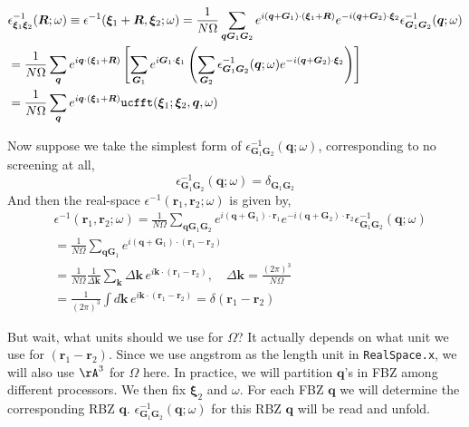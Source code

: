 \documentclass[11pt, oneside]{article}          %
\begin{document}
\begin{equation}
  \label{eq:epsinv_G_to_xi}
  \begin{aligned}
    & \epsilon^{-1}_{{\bm \xi}_1 {\bm \xi}_2} ({\bm R}; \omega) \equiv \epsilon^{-1} ({\bm \xi}_1+{\bm R}, {\bm \xi}_2; \omega) = \frac{1}{N \Omega} \sum_{{\bm q} {\bm G}_1 {\bm G}_2} e^{i ({\bm q} + {\bm G}_1) \cdot ({\bm \xi}_1 + {\bm R})} e^{-i ({\bm q} + {\bm G}_2) \cdot {\bm \xi}_2} \epsilon^{-1}_{{\bm G}_1 {\bm G}_2} ({\bm q};\omega) \\
    & = \frac{1}{N \Omega} \sum_{{\bm q}} e^{i {\bm q} \cdot ({\bm \xi}_1 + {\bm R})} \left [ \sum_{{\bm G}_1} e^{i {\bm G}_1 \cdot {\bm \xi}_1} \left ( \sum_{{\bm G}_2} \epsilon^{-1}_{{\bm G}_1 {\bm G}_2} ({\bm q}; \omega) e^{-i ({\bm q} + {\bm G}_2) \cdot {\bm \xi}_2} \right ) \right ] \\
    & = \frac{1}{N \Omega} \sum_{{\bm q}} e^{i {\bm q} \cdot ( {\bm \xi}_1 + {\bm R} ) } {\tt ucfft}( {\bm \xi}_1; {\bm \xi}_2, {\bm q}, \omega)
  \end{aligned}
\end{equation}

Now suppose we take the simplest form of $\epsilon^{-1}_{{\bm G}_1 {\bm G}_2} ({\bm q}; \omega)$, corresponding to no screening at all,
\begin{equation}
  \label{eq:simple_epsinv}
  \epsilon^{-1}_{{\bm G}_1 {\bm G}_2} ({\bm q}; \omega) = \delta_{{\bm G}_1 {\bm G}_2}
\end{equation}
And then the real-space $\epsilon^{-1}({\bm r}_1, {\bm r}_2; \omega)$ is given by,
\begin{equation}
  \label{eq:real_space_simple_epsinv}
  \begin{aligned}
    & \epsilon^{-1} ({\bm r}_1, {\bm r}_2; \omega) = \frac{1}{N \Omega} \sum_{{\bm q} {\bm G}_1 {\bm G}_2} e^{i ({\bm q} + {\bm G}_1) \cdot {\bm r}_1} e^{-i ({\bm q} + {\bm G}_2) \cdot {\bm r}_2} \epsilon^{-1}_{{\bm G}_1 {\bm G}_2} ({\bm q}; \omega) \\
    & = \frac{1}{N \Omega} \sum_{{\bm q} {\bm G}_1} e^{i ({\bm q} + {\bm G}_1) \cdot ({\bm r}_1 - {\bm r}_2)} \\
    & = \frac{1}{N \Omega} \frac{1}{\Delta {\bm k}} \sum_{{\bm k}} \Delta {\bm k} \, e^{i {\bm k} \cdot ({\bm r}_1 - {\bm r}_2)}, \quad \Delta {\bm k} = \frac{(2\pi)^3}{N \Omega} \\
    & = \frac{1}{(2 \pi)^3} \int d {\bm k}\, e^{i {\bm k} \cdot ({\bm r}_1 - {\bm r}_2)} = \delta ({\bm r}_1 - {\bm r}_2)
  \end{aligned}
\end{equation}

But wait, what units should we use for $\Omega$? It actually depends on what unit we use for $({\bm r}_1 - {\bm r}_2)$. Since we use angstrom as the length unit in {\tt RealSpace.x}, we will also use ${\tt \AA}^{3}$ for $\Omega$ here. In practice, we will partition ${\bm q}$'s in FBZ among different processors. We then fix ${\bm \xi}_2$ and $\omega$. For each FBZ ${\bm q}$ we will determine the corresponding RBZ ${\bm q}$. $\epsilon^{-1}_{{\bm G}_1 {\bm G}_2} ({\bm q}; \omega)$ for this RBZ ${\bm q}$ will be read and unfold.



\end{document}
